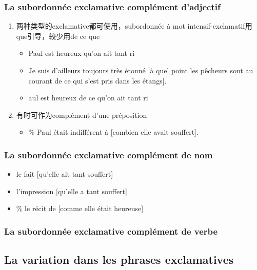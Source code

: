 \documentclass[UTF8]{report}
\begin{document}
\subsubsection{La subordonnée exclamative complément d’adjectif}
\begin{enumerate}
    \item 两种类型的exclamative都可使用，subordonnée à mot intensif-exclamatif用que引导，较少用de ce que
    \begin{itemize}
        \item Paul est heureux qu’on ait tant ri
        \item Je suis d’ailleurs toujours très étonné [à quel point les pêcheurs sont au courant de ce qui s’est pris dans les étangs].
        \item aul est heureux de ce qu’on ait tant ri
    \end{itemize}
    \item 有时可作为complément d’une préposition
    \begin{itemize}
        \item \% Paul était indifférent à [combien elle avait souffert].
    \end{itemize}
\end{enumerate}

\subsubsection{ La subordonnée exclamative complément de nom}
\begin{itemize}
    \item le fait [qu’elle ait tant souffert]
    \item l’impression [qu’elle a tant souffert]
    \item \% le récit de [comme elle était heureuse]
\end{itemize}

\subsubsection{La subordonnée exclamative complément de verbe}


\subsection{La variation dans les phrases exclamatives}
\end{document}
